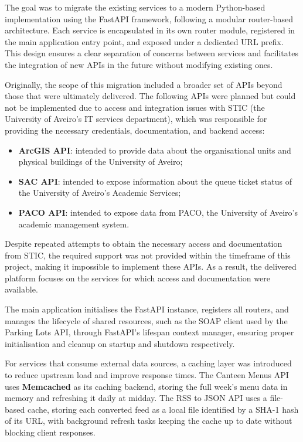 \documentclass[12pt, a4paper]{report}
\begin{document}
The goal was to migrate the existing services to a modern Python-based implementation using
the FastAPI framework, following a modular router-based architecture. Each service is
encapsulated in its own router module, registered in the main application entry point,
and exposed under a dedicated URL prefix. This design ensures a clear separation of concerns
between services and facilitates the integration of new APIs in the future without modifying
existing ones.

Originally, the scope of this migration included a broader set of APIs beyond those that
were ultimately delivered. The following APIs were planned but could not be implemented
due to access and integration issues with STIC (the University of Aveiro's IT services
department), which was responsible for providing the necessary credentials, documentation,
and backend access:

\begin{itemize}
    \item \textbf{ArcGIS API}: intended to provide data about the
          organisational units and physical buildings of the University of Aveiro;
    \item \textbf{SAC API}: intended to expose information about the queue ticket status
          of the University of Aveiro's Academic Services;
    \item \textbf{PACO API}: intended to expose data from PACO, the University of Aveiro's
          academic management system.
\end{itemize}

Despite repeated attempts to obtain the necessary access and documentation from STIC,
the required support was not provided within the timeframe of this project, making it
impossible to implement these APIs. As a result, the delivered platform focuses on the
services for which access and documentation were available.

The main application initialises the FastAPI instance, registers all routers, and manages
the lifecycle of shared resources, such as the SOAP client used by the Parking Lots API,
through FastAPI's lifespan context manager, ensuring proper initialisation and cleanup
on startup and shutdown respectively.

For services that consume external data sources, a caching layer was introduced to reduce
upstream load and improve response times. The Canteen Menus API uses \textbf{Memcached}
as its caching backend, storing the full week's menu data in memory and refreshing it
daily at midday. The RSS to JSON API uses a file-based cache, storing each converted
feed as a local file identified by a SHA-1 hash of its URL, with background refresh tasks
keeping the cache up to date without blocking client responses.
\end{document}
